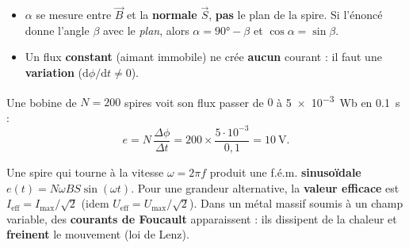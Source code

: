 \documentclass[11pt,a4paper]{article}
\newcommand{\vv}[1]{\vec{#1}}\newcommand{\ds}{\displaystyle}
\begin{document}
\begin{piege}
\begin{itemize}[leftmargin=1.5em,topsep=1pt,itemsep=0pt]
  \item $\alpha$ se mesure entre $\vv{B}$ et la \textbf{normale} $\vv{S}$, \textbf{pas} le plan de la
        spire. Si l'énoncé donne l'angle $\beta$ avec le \emph{plan}, alors $\alpha=\ang{90}-\beta$ et
        $\cos\alpha=\sin\beta$.
  \item Un flux \textbf{constant} (aimant immobile) ne crée \textbf{aucun} courant : il faut une
        \textbf{variation} ($\mathrm{d}\phi/\mathrm{d} t\neq0$).
\end{itemize}
\end{piege}

\begin{exemplebox}[f.é.m. induite]
Une bobine de $N=200$ spires voit son flux passer de $0$ à \qty{5e-3}{\weber} en \qty{0.1}{\second} :
\[ e=N\,\frac{\Delta\phi}{\Delta t}=200\times\frac{5\cdot10^{-3}}{0{,}1}=\qty{10}{\volt}. \]
\end{exemplebox}

\begin{remarque}
Une spire qui tourne à la vitesse $\omega=2\pi f$ produit une f.é.m. \textbf{sinusoïdale}
$e(t)=N\omega BS\sin(\omega t)$. Pour une grandeur alternative, la \textbf{valeur efficace} est
$\boxed{I_{\text{eff}}=I_{\max}/\sqrt2}$ (idem $U_{\text{eff}}=U_{\max}/\sqrt2$). Dans un métal massif
soumis à un champ variable, des \textbf{courants de Foucault} apparaissent : ils dissipent de la chaleur
et \textbf{freinent} le mouvement (loi de Lenz).
\end{remarque}
\end{document}
